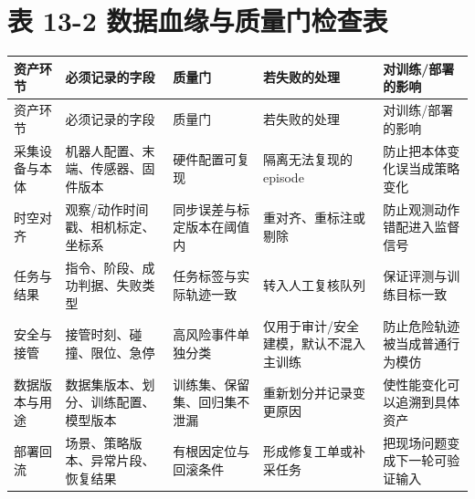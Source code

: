 \section*{表 13-2 数据血缘与质量门检查表}

\begingroup
\small
\begin{xltabular}{\textwidth}{YYYYY}
\toprule
资产环节 & 必须记录的字段 & 质量门 & 若失败的处理 & 对训练/部署的影响 \\
\midrule
\endfirsthead
\toprule
资产环节 & 必须记录的字段 & 质量门 & 若失败的处理 & 对训练/部署的影响 \\
\midrule
\endhead
采集设备与本体 & 机器人配置、末端、传感器、固件版本 & 硬件配置可复现 & 隔离无法复现的 episode & 防止把本体变化误当成策略变化 \\
时空对齐 & 观察/动作时间戳、相机标定、坐标系 & 同步误差与标定版本在阈值内 & 重对齐、重标注或剔除 & 防止观测动作错配进入监督信号 \\
任务与结果 & 指令、阶段、成功判据、失败类型 & 任务标签与实际轨迹一致 & 转入人工复核队列 & 保证评测与训练目标一致 \\
安全与接管 & 接管时刻、碰撞、限位、急停 & 高风险事件单独分类 & 仅用于审计/安全建模，默认不混入主训练 & 防止危险轨迹被当成普通行为模仿 \\
数据版本与用途 & 数据集版本、划分、训练配置、模型版本 & 训练集、保留集、回归集不泄漏 & 重新划分并记录变更原因 & 使性能变化可以追溯到具体资产 \\
部署回流 & 场景、策略版本、异常片段、恢复结果 & 有根因定位与回滚条件 & 形成修复工单或补采任务 & 把现场问题变成下一轮可验证输入 \\
\bottomrule
\end{xltabular}
\endgroup
